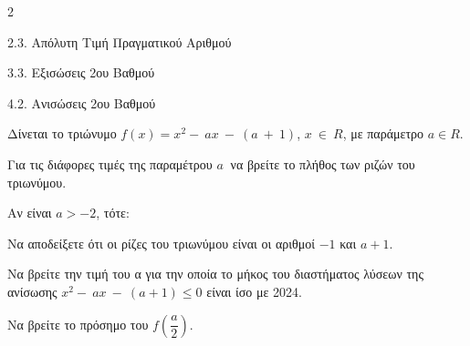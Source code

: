 \begin{ylh}{2}
    \item 2.3. Απόλυτη Τιμή Πραγματικού Αριθμού
    \item 3.3. Εξισώσεις 2ου Βαθμού
    \item 4.2. Ανισώσεις 2ου Βαθμού
\end{ylh}
Δίνεται το τριώνυμο $f(x) = x^{2} - \ a x\  - \ (a\  + \ 1)$, $x\  \in \ R$, με παράμετρο $a \in R.$

\begin{alist}
\item Για τις διάφορες τιμές της παραμέτρου $a\ $ να βρείτε το πλήθος των ριζών του τριωνύμου.
\item Αν είναι $a > - 2$, τότε:
\begin{rlist}
\item Να αποδείξετε ότι οι ρίζες του τριωνύμου είναι οι αριθμοί $- 1$ και $a + 1$.
\item Να βρείτε την τιμή του α για την οποία το μήκος του διαστήματος λύσεων της ανίσωσης $x^{2} - \ a x\  - \ (a + 1) \leq 0$ είναι ίσο με 2024.
\item Να βρείτε το πρόσημο του $f\left( \dfrac{a}{2} \right)$.
\end{rlist}
\end{alist}


